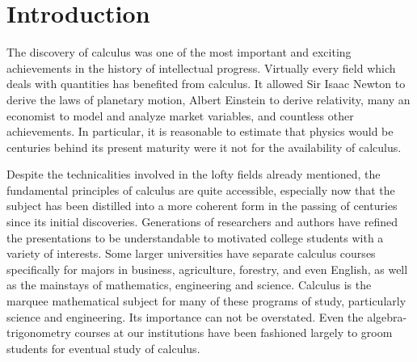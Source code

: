 \chapter{Introduction}
The discovery of calculus was one of the most important and exciting
achievements in the history of intellectual progress.
Virtually every field which deals with quantities
has benefited from calculus.
It allowed Sir Isaac Newton to derive the laws of planetary motion,
Albert Einstein to derive relativity, 
many an economist to model and analyze
market variables, and countless other achievements.
In particular, it is reasonable to estimate that physics would
be centuries behind its present maturity were it not for the
availability of calculus.

Despite the technicalities involved in the lofty fields already
mentioned, the fundamental principles of calculus are quite
accessible, especially now that the subject
has been distilled into a more  coherent form in the
passing of 
centuries since its initial discoveries.  Generations of 
researchers and authors have refined the presentations
to be understandable to motivated college students with
a variety of  interests. Some larger universities
have separate
calculus courses specifically for majors in business, agriculture,
forestry, and even English, as well as the mainstays
of mathematics, engineering and science.
Calculus is the marquee mathematical subject
for many of these programs of study, particularly science 
and engineering.
Its importance can not be overstated.
Even the algebra-trigonometry courses at our
institutions have been fashioned largely to groom
students for eventual study of calculus. 

